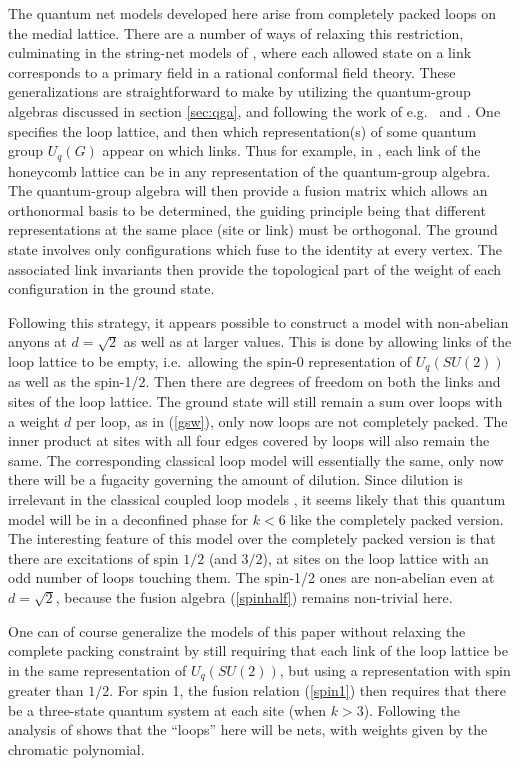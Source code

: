 \documentclass[11pt]{article}
\begin{document}
The quantum net models developed here arise
from completely packed loops on the medial lattice. There
are a number of ways of relaxing this restriction, culminating in the
string-net models of \cite{LevinWen}, where each allowed state on a
link corresponds to a primary field in a rational conformal field
theory. These generalizations are straightforward to make by utilizing
the quantum-group algebras discussed in section \ref{sec:qga}, and
following the work of e.g.\ \cite{Kuperberg} and \cite{LevinWen}. One
specifies the loop lattice, and then which representation(s) of some
quantum group $U_q(G)$ appear on which links. Thus for example, in
\cite{LevinWen}, each link of the honeycomb lattice can be in any
representation of the quantum-group algebra. The quantum-group algebra
will then provide a fusion matrix which allows an orthonormal basis to
be determined, the guiding principle being that different
representations at the same place (site or link) must be
orthogonal. The ground state involves only configurations which fuse
to the identity at every vertex. The associated link invariants then
provide the topological part of the weight of each configuration in the
ground state.


Following this strategy, it appears possible to construct a model with
non-abelian anyons at $d=\sqrt{2}$ as well as at larger values. This
is done by allowing links of the loop lattice to be empty, i.e.\
allowing the spin-0 representation of $U_q(SU(2))$ as well as the
spin-1/2. Then there are degrees of freedom on both the links and
sites of the loop lattice. The ground state will still remain a sum
over loops with a weight $d$ per loop, as in (\ref{gsw}), only now
loops are not completely packed. The inner product at sites with all
four edges covered by loops will also remain the same. The
corresponding classical loop model will essentially the same, only now
there will be a fugacity governing the amount of dilution. Since
dilution is irrelevant in the classical coupled loop models \cite{FJ},
it seems likely that this quantum model will be in a deconfined phase
for $k<6$ like the completely packed version. The interesting feature
of this model over the completely packed version is that there are
excitations of spin $1/2$ (and $3/2$), at sites on the loop lattice
with an odd number of loops touching them. The spin-1/2 ones are
non-abelian even at $d=\sqrt{2}$, because the fusion algebra
(\ref{spinhalf}) remains non-trivial here.

One can of course generalize the models of this paper without relaxing
the complete packing constraint by still requiring that each link of
the loop lattice be in the same representation of $U_q(SU(2))$, but
using a representation with spin greater than $1/2$. For
spin 1, the fusion relation (\ref{spin1}) then requires that there be a
three-state quantum system at each site (when $k>3$). Following the
analysis of \cite{FR,FF,FKrush,FKrush2} shows that the ``loops''
here will be nets, with weights given by the chromatic polynomial. 
\end{document}

